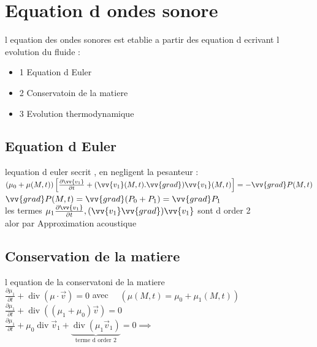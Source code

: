 \documentclass[12pt]{book}
\begin{document}
        \section{Equation d ondes sonore}
            l equation des ondes sonores est etablie a partir des equation d ecrivant l evolution du fluide :
                \begin{itemize}
                    \item  1 Equation d Euler 
                    \item  2 Conservatoin de la matiere 
                    \item  3 Evolution thermodynamique
                \end{itemize}
            \subsection{Equation d Euler}
                lequation d euler secrit , en negligent la pesanteur : \\ 
                $(\mu_0 + \mu(M,t))\left[\frac{\partial \vv{v_1}}{\partial t}+(\vv{v_1}(M,t).\vv{grad})\vv{v_1}(M,t) \right] = -\vv{grad}P(M,t)$ \\
                $\vv{grad}P(M,t) = \vv{grad}(P_0+P_1)=\vv{grad} P_1$\\
                les termes $\mu_1\frac{\partial\vv{v_1}}{\partial t},(\vv{v_1}\vv{grad})\vv{v_1}$ sont d order 2 \\
                alor par Approximation acoustique 
            \subsection{Conservation de la matiere}
                l equation de la conservatoni de la matiere \\
                $\frac{\partial \mu_1}{\partial t}+\operatorname{div}(\mu \cdot \vec{v})=0 $ avec $\quad (\mu(M, t)=\mu_{0}+\mu_{1}(M, t))$\\
                $\frac{\partial \mu_{1}}{\partial t}+\operatorname{div}\left(\left(\mu_{1}+\mu_{0}\right) \vec{v}\right)=0$\\
                $\frac{\partial \mu_{1}}{\partial t}+\mu_{0} \operatorname{div} \vec{v}_{1}+\underbrace{\operatorname{div}\left(\mu_{1} \vec{v}_{1}\right)}_{\text{terme d order 2}}=0 \implies$
            \pagebreak
\end{document}
